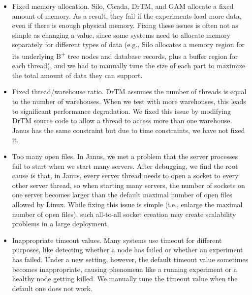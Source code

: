 \begin{itemize}[leftmargin=*]

    \vspace{-.05in}
    \item Fixed memory allocation. Silo, Cicada, DrTM, and GAM allocate a fixed
    amount of memory. As a result, they fail if the experiments load more data,
    even if there is enough physical memory. Fixing these issues is often not
    as simple as changing a value, since some systems need to allocate memory 
    separately for different types of data 
    (e.g., Silo allocates a memory region for its underlying B\textsuperscript{+} tree nodes and database records, 
    plus a buffer region for each thread), and we had to manually tune the size of each part to
    maximize the total amount of data they can support.
    
    \vspace{-.05in}
    \item Fixed thread/warehouse ratio. DrTM assumes the
    number of threads is equal to the number of warehouses. When we test with
    more warehouses, this leads to significant performance degradation.
    We fixed this issue by modifying DrTM source
    code to allow a thread to access more than one warehouse. Janus
    has the same constraint but due to time constraints, we have not fixed it.
    
    \vspace{-.05in}
    \item Too many open files. In Janus, we met a problem that the server processes
    fail to start when we start many servers. After debugging, we find the root cause
    is that, in Janus, every server thread needs to open a socket to every other server
    thread, so when starting many servers, the number of sockets on one server becomes larger
    than the default maximal number of open files allowed by Linux. While fixing this issue is simple (i.e.,
    enlarge the maximal number of open files), such all-to-all socket creation may create
    scalability problems in a large deployment.
    
    \vspace{-.05in}
    \item Inappropriate timeout values. Many systems use timeout for different purposes, like
    detecting whether a node has failed or whether an experiment has failed. Under a new
    setting, however, the default timeout value sometimes becomes inappropriate, causing phenomena
    like a running experiment or a healthy node getting killed. We manually tune
    the timeout value when the default one does not work.
    

\end{itemize}
